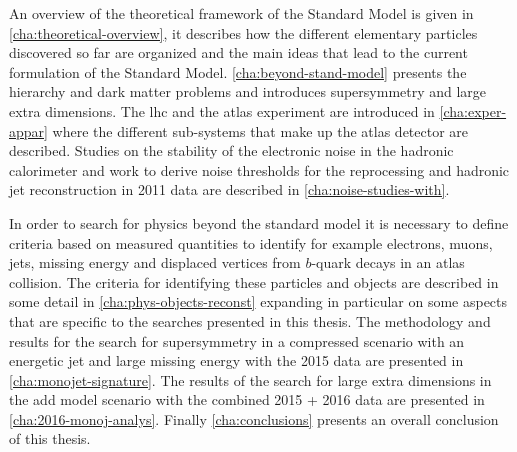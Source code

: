 An overview of the theoretical framework of the Standard Model is given in
\cref{cha:theoretical-overview}, it describes how the different elementary
particles discovered so far are organized and the main ideas that lead to the
current formulation of the Standard Model. \cref{cha:beyond-stand-model}
presents the hierarchy and dark matter problems and introduces supersymmetry and
large extra dimensions. The \gls{lhc} and the \gls{atlas} experiment are
introduced in \cref{cha:exper-appar} where the different sub-systems that make
up the \gls{atlas} detector are described. Studies on the stability of the
electronic noise in the hadronic calorimeter and work to derive noise thresholds
for the reprocessing and hadronic jet reconstruction in 2011 data are described
in \cref{cha:noise-studies-with}.

In order to search for physics beyond the standard model it is necessary to
define criteria based on measured quantities to identify for example electrons,
muons, jets, missing energy and displaced vertices from $b$-quark decays in an
\gls{atlas} collision. The criteria for identifying these particles and objects
are described in some detail in \cref{cha:phys-objects-reconst} expanding in
particular on some aspects that are specific to the searches presented in this
thesis. The methodology and results for the search for supersymmetry in a
compressed scenario with an energetic jet and large missing energy with the 2015
data are presented in \cref{cha:monojet-signature}. The results of the search
for large extra dimensions in the \gls{add} model scenario with the combined
2015 + 2016 data are presented in \cref{cha:2016-monoj-analys}. Finally
\cref{cha:conclusions} presents an overall conclusion of this thesis.

